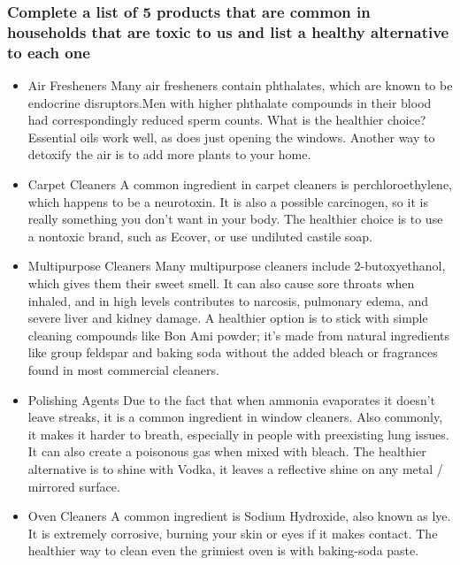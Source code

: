 \documentclass[11pt]{article}
\begin{document}
\subsubsection*{Complete a list of 5 products that are common in households that are toxic to us and list a healthy alternative to each one}
\label{sec:org0dfc1d2}
\begin{itemize}
\item Air Fresheners
\label{sec:orgfc1e984}
Many air fresheners contain phthalates, which are known to be endocrine disruptors.Men with higher phthalate compounds in their blood had correspondingly reduced sperm counts. What is the healthier choice? Essential oils work well, as does just opening the windows. Another way to detoxify the air is to add more plants to your home. \cite{experience}
\item Carpet Cleaners
\label{sec:orga4a4b3e}
A common ingredient in carpet cleaners is perchloroethylene, which happens to be a neurotoxin. It is also a possible carcinogen, so it is really something you don't want in your body. The healthier choice is to use a nontoxic brand, such as Ecover, or use undiluted castile soap. \cite{experience} 
\item Multipurpose Cleaners
\label{sec:orgaedf47b}
Many multipurpose cleaners include 2-butoxyethanol, which gives them their sweet smell. It can also cause sore throats when inhaled, and in high levels contributes to narcosis, pulmonary edema, and severe liver and kidney damage. A healthier option is to stick with simple cleaning compounds like Bon Ami powder; it's made from natural ingredients like group feldspar and baking soda without the added bleach or fragrances found in most commercial cleaners. \cite{experience}
\item Polishing Agents
\label{sec:orgfb16618}
Due to the fact that when ammonia evaporates it doesn't leave streaks, it is a common ingredient in window cleaners. Also commonly, it makes it harder to breath, especially in people with preexisting lung issues. It can also create a poisonous gas when mixed with bleach. The healthier alternative is to shine with Vodka, it leaves a reflective shine on any metal / mirrored surface. \cite{experience}
\item Oven Cleaners
\label{sec:orge0002dc}
A common ingredient is Sodium Hydroxide, also known as lye. It is extremely corrosive, burning your skin or eyes if it makes contact. The healthier way to clean even the grimiest oven is with baking-soda paste. \cite{experience}
\end{itemize}
\end{document}
